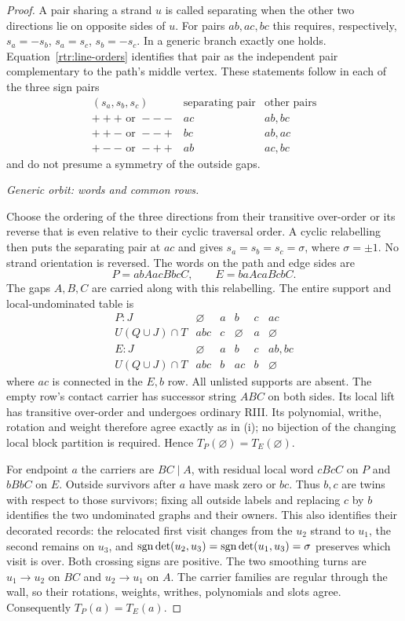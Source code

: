 \begin{proof}
A pair sharing a strand $u$ is called separating when the other two
directions lie on opposite sides of $u$. For pairs $ab,ac,bc$ this
requires, respectively, $s_a=-s_b$, $s_a=s_c$, $s_b=-s_c$.
In a generic branch exactly one holds. Equation~\eqref{rtr:line-orders}
identifies that pair as the independent pair complementary to the
path's middle vertex. These statements follow in each of the three
sign pairs
\[
 \begin{array}{c|c|c}
 (s_a,s_b,s_c)&\text{separating pair}&\text{other pairs}\\ \hline
 +++\text{ or }---&ac&ab,bc\\
 ++-\text{ or }--+&bc&ab,ac\\
 +--\text{ or }-++&ab&ac,bc
 \end{array}
\]
and do not presume a symmetry of the outside gaps.

\par\medskip\noindent\emph{Generic orbit: words and common rows.}\par
Choose the ordering of the three directions from their transitive
over-order or its reverse that is even relative to their cyclic
traversal order. A cyclic relabelling then puts the separating pair
at $ac$ and gives $s_a=s_b=s_c=\sigma$, where $\sigma=\pm1$.
No strand orientation is reversed. The words on the path and edge
sides are
\begin{equation}\label{rtr:generic-words}
 P=a b A a c B b c C,\qquad E=b a A c a B c b C.
\end{equation}
The gaps $A,B,C$ are carried along with this relabelling. The entire
support and local-undominated table is
\[
\begin{array}{c|ccccc}
 P:J&\varnothing&a&b&c&ac\\
 U(Q\cup J)\cap T&abc&c&\varnothing&a&\varnothing\\ \hline
 E:J&\varnothing&a&b&c&ab,bc\\
 U(Q\cup J)\cap T&abc&b&ac&b&\varnothing
\end{array}
\]
where $ac$ is connected in the $E,b$ row. All unlisted supports are
absent. The empty row's contact carrier has successor string $ABC$
on both sides. Its local lift has transitive over-order and undergoes
ordinary RIII. Its polynomial, writhe, rotation and weight therefore
agree exactly as in (i); no bijection of the changing local block
partition is required. Hence $T_P(\varnothing)=T_E(\varnothing)$.

For endpoint $a$ the carriers are $BC\mid A$, with residual local
word $cBcC$ on $P$ and $bBbC$ on $E$. Outside survivors after $a$
have mask zero or $bc$. Thus $b,c$ are twins with respect to those
survivors; fixing all outside labels and replacing $c$ by $b$ identifies
the two undominated graphs and their owners. This also identifies
their decorated records: the relocated first visit changes from the
$u_2$ strand to $u_1$, the second remains on $u_3$, and
$\operatorname{sgn}\det(u_2,u_3)=\operatorname{sgn}\det(u_1,u_3)=\sigma$ preserves which visit
is over. Both crossing signs are positive. The two smoothing turns
are $u_1\to u_2$ on $BC$ and $u_2\to u_1$ on $A$.
The carrier families are regular through the wall, so their rotations,
weights, writhes, polynomials and slots agree.
Consequently $T_P(a)=T_E(a)$.


\end{proof}
